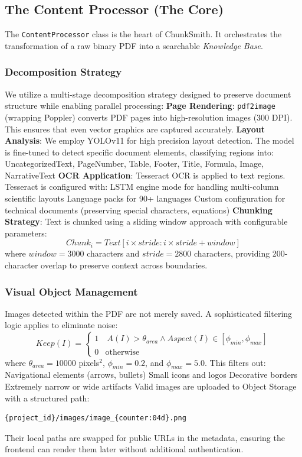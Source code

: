 \documentclass[conference]{IEEEtran}
\begin{document}
\subsection{The Content Processor (The Core)}
The \texttt{ContentProcessor} class is the heart of ChunkSmith. It orchestrates the transformation of a raw binary PDF into a searchable \textit{Knowledge Base}.
\subsubsection{Decomposition Strategy}
We utilize a multi-stage decomposition strategy designed to preserve document structure while enabling parallel processing:
\textbf{Page Rendering}: \texttt{pdf2image} (wrapping Poppler) converts PDF pages into high-resolution images (300 DPI). This ensures that even vector graphics are captured accurately.
\textbf{Layout Analysis}: We employ YOLOv11 for high precision layout detection. The model is fine-tuned to detect specific document elements, classifying regions into:
     UncategorizedText, PageNumber, Table, Footer, Title, Formula, Image, NarrativeText
\textbf{OCR Application}: Tesseract OCR is applied to text regions. Tesseract is configured with: LSTM engine mode for handling multi-column scientific layouts Language packs for 90+ languages Custom configuration for technical documents (preserving special characters, equations) \textbf{Chunking Strategy}: Text is chunked using a sliding window approach with configurable parameters:
    \begin{equation}
    Chunk_i = Text[i \times stride : i \times stride + window]
    \end{equation}
    where $window = 3000$ characters and $stride = 2800$ characters, providing 200-character overlap to preserve context across boundaries.
\subsubsection{Visual Object Management}
Images detected within the PDF are not merely saved. A sophisticated filtering logic applies to eliminate noise:
\begin{equation}
Keep(I) = \begin{cases} 
1 & \ A(I) > \theta_{area} \land Aspect(I) \in [\phi_{min}, \phi_{max}] \\
0 & \text{otherwise}
\end{cases}
\end{equation}
where $\theta_{area} = 10000$ pixels$^2$, $\phi_{min} = 0.2$, and $\phi_{max} = 5.0$. This filters out:
Navigational elements (arrows, bullets)
Small icons and logos
Decorative borders
Extremely narrow or wide artifacts
Valid images are uploaded to Object Storage with a structured path:
\begin{verbatim}
{project_id}/images/image_{counter:04d}.png
\end{verbatim}
Their local paths are swapped for public URLs in the metadata, ensuring the frontend can render them later without additional authentication.
\end{document}
